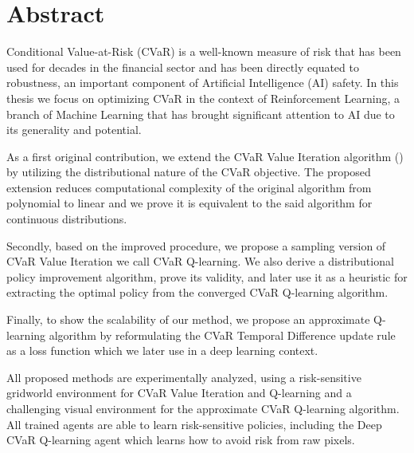 \begingroup
\let\clearpage\relax
\let\cleardoublepage\relax
\let\cleardoublepage\relax

\chapter*{Abstract}


Conditional Value-at-Risk (CVaR) is a well-known measure of risk that has been used for decades in the financial sector and has been directly equated to robustness, an important component of Artificial Intelligence (AI) safety. In this thesis we focus on optimizing CVaR in the context of Reinforcement Learning, a branch of Machine Learning that has brought significant attention to AI due to its generality and potential.

As a first original contribution, we extend the CVaR Value Iteration algorithm (\citet{chow2015risk}) by utilizing the distributional nature of the CVaR objective. The proposed extension reduces computational complexity of the original algorithm from polynomial to linear and we prove it is equivalent to the said algorithm for continuous distributions.

Secondly, based on the improved procedure, we propose a sampling version of CVaR Value Iteration we call CVaR Q-learning. We also derive a distributional policy improvement algorithm, prove its validity, and later use it as a heuristic for extracting the optimal policy from the converged CVaR Q-learning algorithm.

Finally, to show the scalability of our method, we propose an approximate Q-learning algorithm by reformulating the CVaR Temporal Difference update rule as a loss function which we later use in a deep learning context.

All proposed methods are experimentally analyzed, using a risk-sensitive gridworld environment for CVaR Value Iteration and Q-learning and a challenging visual environment for the approximate CVaR Q-learning algorithm. All trained agents are able to learn risk-sensitive policies, including the  Deep CVaR Q-learning agent which learns how to avoid risk from raw pixels.



%
%

\endgroup

\vfill
